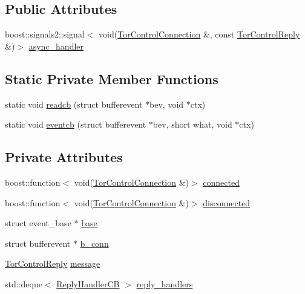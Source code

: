 \subsection*{Public Attributes}
\begin{DoxyCompactItemize}
\item 
boost\+::signals2\+::signal$<$ void(\mbox{\hyperlink{class_tor_control_connection}{Tor\+Control\+Connection}} \&, const \mbox{\hyperlink{class_tor_control_reply}{Tor\+Control\+Reply}} \&)$>$ \mbox{\hyperlink{class_tor_control_connection_a23c206776020bd925c2da41e840cc08a}{async\+\_\+handler}}
\end{DoxyCompactItemize}
\subsection*{Static Private Member Functions}
\begin{DoxyCompactItemize}
\item 
static void \mbox{\hyperlink{class_tor_control_connection_a7d7e2393f19cb41c32223def3df769ea}{readcb}} (struct bufferevent $\ast$bev, void $\ast$ctx)
\item 
static void \mbox{\hyperlink{class_tor_control_connection_a8b22b26822247f8be7d739e14a045e98}{eventcb}} (struct bufferevent $\ast$bev, short what, void $\ast$ctx)
\end{DoxyCompactItemize}
\subsection*{Private Attributes}
\begin{DoxyCompactItemize}
\item 
boost\+::function$<$ void(\mbox{\hyperlink{class_tor_control_connection}{Tor\+Control\+Connection}} \&)$>$ \mbox{\hyperlink{class_tor_control_connection_ad8b8800db771cb4ca39efb078509bef4}{connected}}
\item 
boost\+::function$<$ void(\mbox{\hyperlink{class_tor_control_connection}{Tor\+Control\+Connection}} \&)$>$ \mbox{\hyperlink{class_tor_control_connection_afa5564a2d7f80d436b92bf6eb4b38192}{disconnected}}
\item 
struct event\+\_\+base $\ast$ \mbox{\hyperlink{class_tor_control_connection_af68563075f85652d32cc0b6d8417699c}{base}}
\item 
struct bufferevent $\ast$ \mbox{\hyperlink{class_tor_control_connection_af110fd86126657931c7c1e44067154da}{b\+\_\+conn}}
\item 
\mbox{\hyperlink{class_tor_control_reply}{Tor\+Control\+Reply}} \mbox{\hyperlink{class_tor_control_connection_a0c9dff9582b57ce132a1629a85e52061}{message}}
\item 
std\+::deque$<$ \mbox{\hyperlink{class_tor_control_connection_a67d9147b8c27456cc7fe15e4d6d8e844}{Reply\+Handler\+CB}} $>$ \mbox{\hyperlink{class_tor_control_connection_a1675ac8361ca030eecd48f32120bddd7}{reply\+\_\+handlers}}
\end{DoxyCompactItemize}


